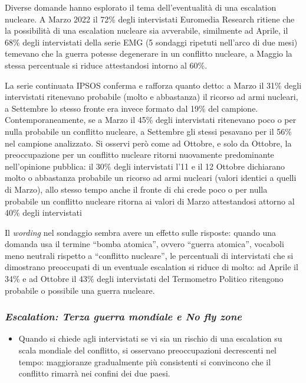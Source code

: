 \documentclass[
]{book}
\providecommand{\tightlist}{%
  \setlength{\itemsep}{0pt}\setlength{\parskip}{0pt}}
\begin{document}
Diverse domande hanno esplorato il tema dell'eventualità di una escalation nucleare. A Marzo 2022 il 72\% degli intervistati Euromedia Research ritiene che la possibilità di una escalation nucleare sia avverabile, similmente ad Aprile, il 68\% degli intervistati della serie EMG (5 sondaggi ripetuti nell'arco di due mesi) temevano che la guerra potesse degenerare in un conflitto nucleare, a Maggio la stessa percentuale si riduce attestandosi intorno al 60\%.

La serie continuata IPSOS conferma e rafforza quanto detto: a Marzo il 31\% degli intervistati ritenevano probabile (molto e abbastanza) il ricorso ad armi nucleari, a Settembre lo stesso fronte era invece formato dal 19\% del campione. Contemporaneamente, se a Marzo il 45\% degli intervistati ritenevano poco o per nulla probabile un conflitto nucleare, a Settembre gli stessi pesavano per il 56\% nel campione analizzato.
Si osservi però come ad Ottobre, e solo da Ottobre, la preoccupazione per un conflitto nucleare ritorni nuovamente predominante nell'opinione pubblica: il 30\% degli intervistati l'11 e il 12 Ottobre dichiarano molto o abbastanza probabile un ricorso ad armi nucleari (valori identici a quelli di Marzo), allo stesso tempo anche il fronte di chi crede poco o per nulla probabile un conflitto nucleare ritorna ai valori di Marzo attestandosi attorno al 40\% degli intervistati

Il \emph{wording} nel sondaggio sembra avere un effetto sulle risposte: quando una domanda usa il termine ``bomba atomica'', ovvero ``guerra atomica'', vocaboli meno neutrali rispetto a ``conflitto nucleare'', le percentuali di intervistati che si dimostrano preoccupati di un eventuale escalation si riduce di molto: ad Aprile il 34\% e ad Ottobre il 43\% degli intervistati del Termometro Politico ritengono probabile o possibile una guerra nucleare.

\hypertarget{escalation-terza-guerra-mondiale-e-no-fly-zone}{%
\subsubsection{\texorpdfstring{\emph{Escalation: Terza guerra mondiale e No fly zone}}{Escalation: Terza guerra mondiale e No fly zone}}\label{escalation-terza-guerra-mondiale-e-no-fly-zone}}

\begin{itemize}
\tightlist
\item
  Quando si chiede agli intervistati se vi sia un rischio di una escalation su scala mondiale del conflitto, si osservano preoccupazioni decrescenti nel tempo: maggioranze gradualmente più consistenti si convincono che il conflitto rimarrà nei confini dei due paesi.
\end{itemize}
\end{document}
